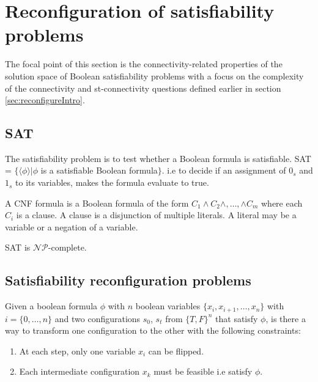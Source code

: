 \section{Reconfiguration of satisfiability problems}
\label{sec:SAT}
The focal point of this section is the connectivity-related properties of the solution space of Boolean satisfiability problems with a focus on the complexity of the connectivity and st-connectivity questions defined earlier in section \ref{sec:reconfigureIntro}.

\subsection{SAT}
\begin{defn}The satisfiability problem is to test whether a Boolean formula is satisfiable. SAT = $\{\langle \phi \rangle | \phi$  is a satisfiable Boolean formula$\}$. i.e to decide if an assignment of $0_s$ and $1_s$ to its variables, makes the formula evaluate to true.
\end{defn}

\begin{defn}
A CNF formula is a Boolean formula of the form $C_1 \wedge C_2 \wedge,\dots,\wedge C_m$ where each $C_i$ is a clause. A clause is a disjunction of multiple literals. A literal may be a variable or a negation of a variable.
\end{defn}

\begin{theorem}
SAT is $\mathcal{NP}$-complete.
\end{theorem}

\subsection{Satisfiability reconfiguration problems}
\begin{defn}
Given a boolean formula $\phi$ with $n$ boolean variables $\{x_i,x_{i+1}, \dots, x_n\}$ with $i = \{0,\dots, n\}$ and two configurations $s_0$, $s_t$ from $\{T,F\}^{n}$ that satisfy $\phi$, is there a way to transform one configuration to the other with the following constraints: 
\begin{enumerate}
    \item At each step, only one variable $x_i$ can be flipped.
    \item Each intermediate configuration $x_k$ must be feasible i.e satisfy $\phi$.
\end{enumerate}
\end{defn}

